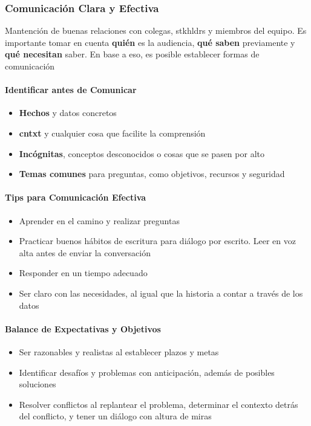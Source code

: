 \subsubsection{Comunicación Clara y Efectiva}
Mantención de buenas relaciones con colegas, \gls{stkhldrs} y miembros del equipo. Es importante tomar en cuenta \textbf{quién} es la audiencia, \textbf{qué saben} previamente y \textbf{qué necesitan} saber. En base a eso, es posible establecer formas de comunicación

\paragraph{Identificar antes de Comunicar}
\begin{itemize}
    \item {\textbf{Hechos} y datos concretos}
    \item {\textbf{\gls{cntxt}} y cualquier cosa que facilite la comprensión}
    \item {\textbf{Incógnitas}, conceptos desconocidos o cosas que se pasen por alto}
    \item {\textbf{Temas comunes} para preguntas, como objetivos, recursos y seguridad}
\end{itemize}

\paragraph{Tips para Comunicación Efectiva}
\begin{itemize}
    \item {Aprender en el camino y realizar preguntas}
    \item {Practicar buenos hábitos de escritura para diálogo por escrito. Leer en voz alta antes de enviar la conversación}
    \item {Responder en un tiempo adecuado}
    \item {Ser claro con las necesidades, al igual que la historia a contar a través de los datos}
\end{itemize}

\paragraph{Balance de Expectativas y Objetivos}
\begin{itemize}
    \item {Ser razonables y realistas al establecer plazos y metas}
    \item {Identificar desafíos y problemas con anticipación, además de posibles soluciones}
    \item {Resolver conflictos al replantear el problema, determinar el contexto detrás del conflicto, y tener un diálogo con altura de miras}
\end{itemize}

